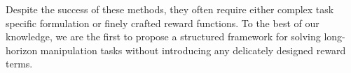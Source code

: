Despite the success of these methods, they often require either complex task specific formulation or finely crafted reward functions. To the best of our knowledge, we are the first to propose a structured framework for solving long-horizon manipulation tasks without introducing any delicately designed reward terms.